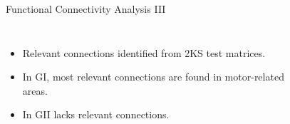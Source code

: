 \documentclass[aspectratio=169]{beamer}
\begin{document}
\begin{frame}{Functional Connectivity Analysis III}
    \begin{columns}
        \begin{itemize}
            \item Relevant connections identified from 2KS test matrices.
            \item In GI, most relevant connections are found in motor-related areas.
            \item In GII lacks relevant connections.
        \end{itemize}
        \begin{figure}
            \centering
                \end{figure}
                \end{columns}

\end{frame}
\end{document}
